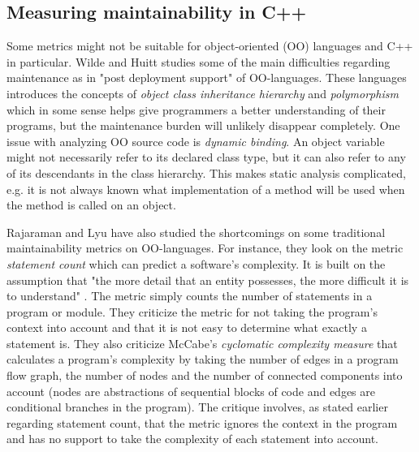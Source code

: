 \subsection{Measuring maintainability in C++}

Some metrics might not be suitable for object-oriented (OO) languages and C++
in particular. Wilde and Huitt \cite{wilde1991maintenance} studies some of the
main difficulties regarding maintenance as in "post deployment support" of
OO-languages. These languages introduces the concepts of \textit{object class
inheritance hierarchy} and \textit{polymorphism} which in some sense helps give
programmers a better understanding of their programs, but the maintenance
burden will unlikely disappear completely. One issue with analyzing OO source
code is \textit{dynamic binding}. An object variable might not necessarily
refer to its declared class type, but it can also refer to any of its
descendants in the class hierarchy. This makes static analysis complicated,
e.g. it is not always known what implementation of a method will be used when
the method is called on an object.

Rajaraman and Lyu \cite{rajaraman1992reliability} have also studied the
shortcomings on some traditional maintainability metrics on OO-languages. For
instance, they look on the metric \textit{statement count} which can predict a
software's complexity. It is built on the assumption that "the more detail that
an entity possesses, the more difficult it is to understand"
\cite{rajaraman1992reliability}. The metric simply counts the number of
statements in a program or module. They criticize the metric for not taking the
program's context into account and that it is not easy to determine what
exactly a statement is. They also criticize McCabe's
\cite{mccabe1976complexity} \textit{cyclomatic complexity measure} that
calculates a program's complexity by taking the number of edges in a program
flow graph, the number of nodes and the number of connected components into
account (nodes are abstractions of sequential blocks of code and edges are
conditional branches in the program). The critique involves, as stated earlier
regarding statement count, that the metric ignores the context in the program
and has no support to take the complexity of each statement into account.

